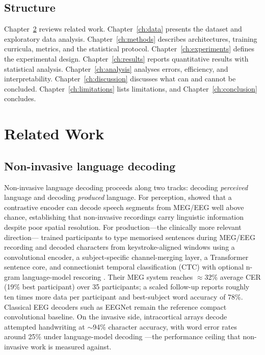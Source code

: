 \documentclass[11pt,a4paper]{report}
\begin{document}
\section{Structure}
Chapter~\ref{ch:related} reviews related work. Chapter~\ref{ch:data}
presents the dataset and exploratory data analysis. Chapter~\ref{ch:methods}
describes architectures, training curricula, metrics, and the statistical
protocol. Chapter~\ref{ch:experiments} defines the experimental design.
Chapter~\ref{ch:results} reports quantitative results with statistical
analysis. Chapter~\ref{ch:analysis} analyses errors, efficiency, and
interpretability. Chapter~\ref{ch:discussion} discusses what can and cannot
be concluded. Chapter~\ref{ch:limitations} lists limitations, and
Chapter~\ref{ch:conclusion} concludes.

\chapter{Related Work}
\label{ch:related}

\section{Non-invasive language decoding}
Non-invasive language decoding proceeds along two tracks: decoding
\emph{perceived} language and decoding \emph{produced} language. For
perception, \citet{defossez2023decoding} showed that a contrastive encoder
can decode speech segments from MEG/EEG well above chance, establishing that
non-invasive recordings carry linguistic information despite poor spatial
resolution. For production---the clinically more relevant
direction---\citet{levy2025brain2qwerty} trained participants to type
memorised sentences during MEG/EEG recording and decoded characters from
keystroke-aligned windows using a convolutional encoder, a subject-specific
channel-merging layer, a Transformer sentence core, and connectionist
temporal classification (CTC) \citep{graves2006ctc} with optional n-gram
language-model rescoring \citep{heafield2011kenlm}. Their MEG system reaches
$\approx$32\% average CER (19\% best participant) over 35 participants; a
scaled follow-up \citep{levy2026brain2qwertyv2} reports roughly ten times
more data per participant and best-subject word accuracy of 78\%. Classical EEG decoders such as EEGNet
\citep{lawhern2018eegnet} remain the reference compact convolutional
baseline. On the invasive side, intracortical arrays decode attempted
handwriting at $\sim$94\% character accuracy, with word error rates around
25\% under language-model decoding \citep{willett2021handwriting}---the
performance ceiling that non-invasive work is measured against.
\end{document}
